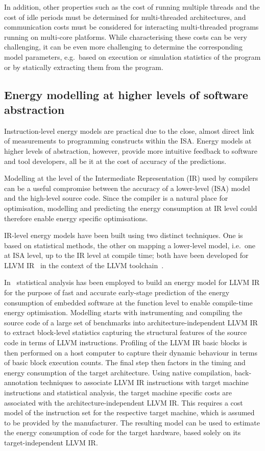 In addition, other properties such as the cost of running multiple threads and
the cost of idle periods must be determined for multi-threaded architectures,
and communication costs must be considered for interacting multi-threaded
programs running on multi-core platforms. 
%
While characterising these costs can be very challenging, it can be even more
challenging to determine the corresponding model parameters, e.g.\ based on
execution or simulation statistics of the program or by statically extracting
them from the program.
 

\subsection{Energy modelling at higher levels of software abstraction}
\label{subsec:mapping}

Instruction-level energy models are practical due to the close, almost direct
link of measurements to programming constructs within the ISA. Energy models at
higher levels of abstraction, however, provide more intuitive feedback to
software and tool developers, all be it at the cost of accuracy of the
predictions.

Modelling at the level of the Intermediate Representation (IR) used by
compilers can be a useful compromise between the accuracy of a lower-level
(ISA) model and the high-level source code. Since the compiler is a natural
place for optimisation, modelling and predicting the energy consumption at IR
level could therefore enable energy specific optimisations.

IR-level energy models have been built using two distinct techniques. One is
based on statistical methods, the other on mapping a lower-level model, i.e.\
one at ISA level, up to the IR level at compile time; both have been developed
for LLVM IR~\cite{LattnerLLVM2004} in the context of the LLVM
toolchain~\cite{LLVM}.

In~\cite{Brandolese2011} statistical analysis has been employed to build an
energy model for LLVM IR for the purpose of fast and accurate early-stage
prediction of the energy consumption of embedded software at the function level
to enable compile-time energy optimisation.
%
Modelling starts with instrumenting and compiling the source code of a large
set of benchmarks into architecture-independent LLVM IR to extract block-level
statistics capturing the structural features of the source code in terms of
LLVM instructions. 
%
Profiling of the LLVM IR basic blocks is then performed on a host computer to
capture their dynamic behaviour in terms of basic block execution counts. 
%
The final step then factors in the timing and energy consumption of the target
architecture. Using native compilation, back-annotation techniques to associate
LLVM IR instructions with target machine instructions and statistical analysis,
the target machine specific costs are associated with the
architecture-independent LLVM IR. This requires a cost model of the instruction
set for the respective target machine, which is assumed to be provided by the
manufacturer. The resulting model can be used to estimate the energy
consumption of code for the target hardware, based solely on its
target-independent LLVM IR.

